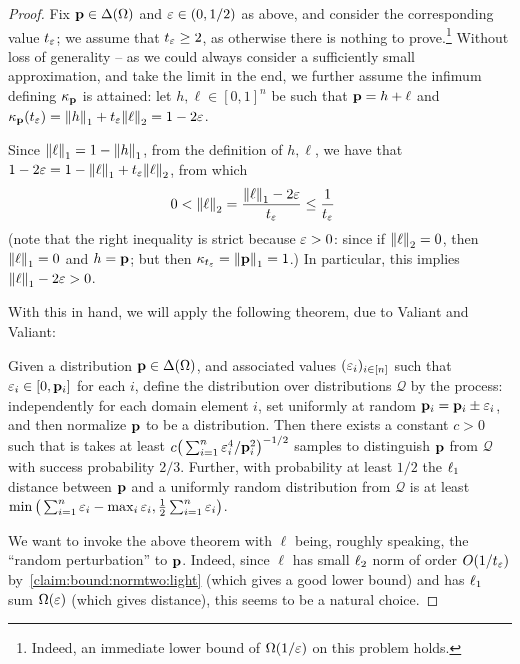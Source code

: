 \begin{proof}
Fix $\p\in\distribs{\domain}$ and $\eps\in(0,1/2)$ as above, and consider the corresponding value $t_\eps$; we assume that $t_\eps \geq 2$, as otherwise there is nothing to prove.\footnote{Indeed, an immediate lower bound of $\bigOmega{1/\eps}$ on this problem holds.} Without loss of generality -- as we could always consider a sufficiently small approximation, and take the limit in the end, we further assume the infimum defining $\kf{\p}$ is attained: let $h,\ell\in[0,1]^n$ be such that $\p=h+\ell$ and $\kf{\p}(t_\eps) = \normone{h}+ t_\eps\normtwo{\ell} = 1-2\eps$.

Since $\normone{\ell} = 1-\normone{h}$, from the definition of $h,\ell$, we have that
$
    1-2\eps = 1-\normone{\ell}+ t_\eps\normtwo{\ell}
$, 
from which
\begin{align}
  0 < \normtwo{\ell} &= \frac{\normone{\ell}-2\eps}{t_\eps} \leq \frac{1}{t_\eps} \label{claim:bound:normtwo:light}
\end{align}
(note that the right inequality is strict because $\eps>0$: since if $\normtwo{\ell} = 0$, then $\normone{\ell}=0$ and $h=\p$; but then $\kf{t_\eps} = \normone{\p}=1$.) In particular, this implies $\normone{\ell}-2\eps > 0$.

With this in hand, we will apply the following theorem, due to Valiant and Valiant:
\begin{theorem}[{\cite[Theorem 4]{VV:14}}]\label{theo:vv:14:blackbox}
  Given a distribution $\p\in\distribs{\domain}$, and associated values $(\eps_i)_{i\in[n]}$ such that $\eps_i\in[0,\p_i]$ for each $i$, define the distribution over distributions $\mathcal{Q}$ by the process: independently for each domain element $i$, set uniformly at random $\q_i = \p_i \pm \eps_i$, and then normalize $\q$ to be a distribution. Then there exists a constant $c>0$ such that is takes at least $c\big(\sum_{i=1}^n {\eps_i^4}/{\p_i^2}\big)^{-1/2}$ samples to distinguish $\p$ from $\mathcal{Q}$ with success probability $2/3$. Further, with probability at least $1/2$ the $\lp[1]$ distance between $\p$ and a uniformly random distribution from $\mathcal{Q}$ is at least $\min\big(\sum_{i=1}^n \eps_i - \max_i \eps_i, \frac{1}{2}\sum_{i=1}^n \eps_i\big)$.
\end{theorem}

We want to invoke the above theorem with $\ell$ being, roughly speaking, the ``random perturbation'' to $\p$. Indeed, since $\ell$ has small $\lp[2]$ norm of order $O(1/t_\eps)$ by~\eqref{claim:bound:normtwo:light} (which gives a good lower bound) and has $\lp[1]$ sum $\bigOmega{\eps}$ (which gives distance), this seems to be a natural choice.


\end{proof}
